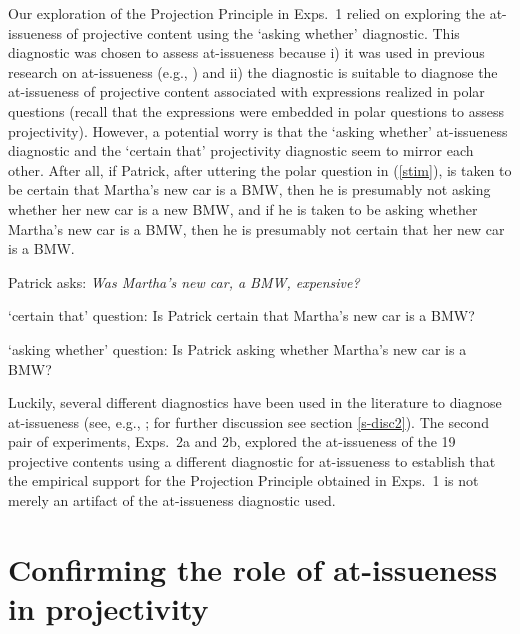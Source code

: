 \documentclass[11pt,fleqn]{article}
\newcommand{\6}{\mbox{$[\hspace*{-.6mm}[$}}
\newcommand{\9}{\mbox{$]\hspace*{-.6mm}]$}}
\begin{document}
Our exploration of the Projection Principle in Exps.~1 relied on exploring the at-issueness of projective content using the `asking whether' diagnostic. This diagnostic was chosen to assess at-issueness because i) it was used in previous research on at-issueness (e.g., \citealt{amaral-etal07,tonhauser-sula6}) and ii) the diagnostic is suitable to diagnose the at-issueness of projective content associated with expressions realized in polar questions (recall that the expressions were embedded in polar questions to assess projectivity). However, a potential worry is that the `asking whether' at-issueness diagnostic and the `certain that' projectivity diagnostic seem to mirror each other. After all, if Patrick, after uttering the polar question in (\ref{stim}), is taken to be certain that Martha's new car is a BMW, then he is presumably not asking whether her new car is a new BMW, and if he is taken to be asking whether Martha's new car is a BMW, then he is presumably not certain that her new car is a BMW.

\begin{exe}

\exi{(\ref{stim})} Patrick asks: {\em Was Martha's new car, a BMW, expensive?} 

\begin{xlist}
\ex `certain that' question: Is Patrick certain that Martha's new car is a BMW?

\ex `asking whether' question: Is Patrick asking whether Martha's new car is a BMW?

\end{xlist}

\end{exe}
Luckily, several different diagnostics have been used in the literature to diagnose at-issueness (see, e.g., \citealt{tonhauser-sula6}; for further discussion see section \ref{s-disc2}). The second pair of experiments, Exps.~2a and 2b, explored the at-issueness of the 19 projective contents using a different diagnostic for at-issueness to establish that the empirical support for the Projection Principle obtained in Exps.~1 is not merely an artifact of the at-issueness diagnostic used.

\section{Confirming the role of at-issueness in projectivity}\label{s4}
\end{document}
